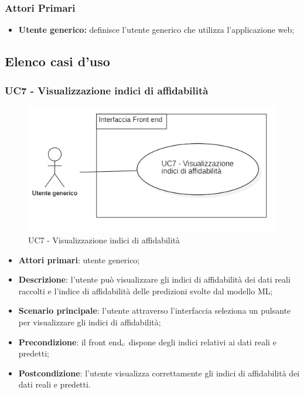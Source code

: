 \subsubsection{Attori Primari}\label{UFattoriPrimariFac}
\begin{itemize}
	\item \textbf{Utente generico:} definisce l'utente generico che utilizza l'applicazione web;
\end{itemize}

\subsection{Elenco casi d'uso}\label{UFelencoCasiDusoFac}
\subsubsection{UC7 - Visualizzazione indici di affidabilità}\label{indiciAffidabilita}
\begin{center}
	\begin{figure}[H]
		\includegraphics[scale=0.7]{../immagini/attori_casi/uc7.png}
		\caption{UC7 - Visualizzazione indici di affidabilità}
	\end{figure}
\end{center}
\begin{itemize}
	\item \textbf{Attori primari}: utente generico;
	\item \textbf{Descrizione}: l'utente può visualizzare gli indici di affidabilità dei dati reali raccolti e l'indice di affidabilità delle predizioni svolte dal modello ML;
	\item \textbf{Scenario principale}: l'utente attraverso l'interfaccia seleziona un pulsante per visualizzare gli indici di affidabilità;
	\item \textbf{Precondizione}: il front end$_{\scaleto{G}{3pt}}$ dispone degli indici relativi ai dati reali e predetti;
	\item \textbf{Postcondizione}: l'utente visualizza correttamente gli indici di affidabilità dei dati reali e predetti. 
\end{itemize}

